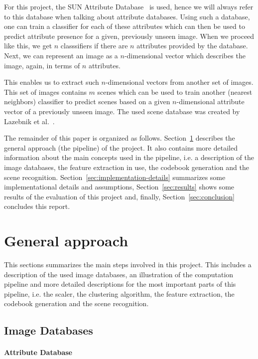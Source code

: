 \documentclass{vldb}
\begin{document}
For this project, the SUN Attribute Database~\cite{Patterson:2012} is used, hence
we will always refer to this database when talking about attribute databases.
Using such a database, one can train a classifier for each of these attributes
which can then be used to predict attribute presence for a given, previously
unseen image. When we proceed like this, we get $n$ classsifiers if there are $n$
attributes provided by the database. Next, we can represent an image as a
$n$-dimensional vector which describes the image, again, in terms of $n$
attributes.

This enables us to extract such $n$-dimensional vectors from another set of
images. This set of images contains $m$ scenes which can be used to train another
(nearest neighbors) classifier to predict scenes based on a given $n$-dimensional
attribute vector of a previously unseen image. The used scene database was created
by Lazebnik et al.~\cite{Lazebnik:2006}.

The remainder of this paper is organized as follows.
Section~\ref{sec:general-approach} describes the general approach (the pipeline)
of the project. It also contains more detailed information about the main
concepts used in the pipeline, i.e. a description of the image databases, the
feature extraction in use, the codebook generation and the scene recognition.
Section~\ref{sec:implementation-details} summarizes some implementational
details and assumptions, Section~\ref{sec:results} shows some results of the
evaluation of this project and, finally, Section~\ref{sec:conclusion} concludes
this report.

\section{General approach}
\label{sec:general-approach}

This sections summarizes the main steps involved in this project. This includes
a description of the used image databases, an illustration of the computation
pipeline and more detailed descriptions for the most important parts of this
pipeline, i.e. the scaler, the clustering algorithm, the feature extraction, the
codebook generation and the scene recognition.

\subsection{Image Databases}
\label{subsec:image-databases}

\paragraph*{Attribute Database}
\label{par:attribute-database}
\end{document}
